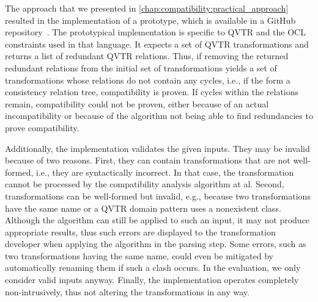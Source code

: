 The approach that we presented in \autoref{chap:compatibility:practical_approach} resulted in the implementation of a prototype, which is available in a GitHub repository~\cite{decompositionGithub}.
%
The prototypical implementation is specific to \gls{QVTR} and the \gls{OCL} constraints used in that language.
It expects a set of \gls{QVTR} transformations and returns a list of redundant \gls{QVTR} relations.
Thus, if removing the returned redundant relations from the initial set of transformations yields a set of transformations whose relations do not contain any cycles, i.e., if the form a consistency relation tree, compatibility is proven.
If cycles within the relations remain, compatibility could not be proven, either because of an actual incompatibility or because of the algorithm not being able to find redundancies to prove compatibility.

Additionally, the implementation validates the given inputs.
They may be invalid because of two reasons.
First, they can contain transformations that are not well-formed, i.e., they are syntactically incorrect. In that case, the transformation cannot be processed by the compatibility analysis algorithm at al.
Second, transformations can be well-formed but invalid, e.g., because two transformations have the same name or a \gls{QVTR} domain pattern uses a nonexistent class.
Although the algorithm can still be applied to such an input, it may not produce appropriate results, thus such errors are displayed to the transformation developer when applying the algorithm in the parsing step.
Some errors, such as two transformations having the same name, could even be mitigated by automatically renaming them if such a clash occurs.
In the evaluation, we only consider valid inputs anyway.
Finally, the implementation operates completely non-intrusively, thus not altering the transformations in any way.


